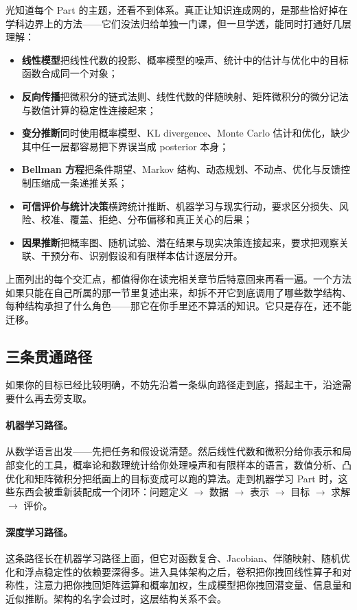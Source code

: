 光知道每个 Part 的主题，还看不到体系。真正让知识连成网的，是那些恰好掉在学科边界上的方法——它们没法归给单独一门课，但一旦学透，能同时打通好几层理解：

\begin{itemize}
\item
  \textbf{线性模型}把线性代数的投影、概率模型的噪声、统计中的估计与优化中的目标函数合成同一个对象；
\item
  \textbf{反向传播}把微积分的链式法则、线性代数的伴随映射、矩阵微积分的微分记法与数值计算的稳定性连接起来；
\item
  \textbf{变分推断}同时使用概率模型、KL divergence、Monte Carlo 估计和优化，缺少其中任一层都容易把下界误当成 posterior 本身；
\item
  \textbf{Bellman 方程}把条件期望、Markov 结构、动态规划、不动点、优化与反馈控制压缩成一条递推关系；
\item
  \textbf{可信评价与统计决策}横跨统计推断、机器学习与现实行动，要求区分损失、风险、校准、覆盖、拒绝、分布偏移和真正关心的后果；
\item
  \textbf{因果推断}把概率图、随机试验、潜在结果与现实决策连接起来，要求把观察关联、干预分布、识别假设和有限样本估计逐层分开。
\end{itemize}

上面列出的每个交汇点，都值得你在读完相关章节后特意回来再看一遍。一个方法如果只能在自己所属的那一节里复述出来，却拆不开它到底调用了哪些数学结构、每种结构承担了什么角色——那它在你手里还不算活的知识。它只是存在，还不能迁移。

\subsection{三条贯通路径}

如果你的目标已经比较明确，不妨先沿着一条纵向路径走到底，搭起主干，沿途需要什么再去旁支取。

\paragraph{机器学习路径。}
从数学语言出发——先把任务和假设说清楚。然后线性代数和微积分给你表示和局部变化的工具，概率论和数理统计给你处理噪声和有限样本的语言，数值分析、凸优化和矩阵微积分把纸面上的目标变成可以跑的算法。走到机器学习 Part 时，这些东西会被重新装配成一个闭环：问题定义 \(\to\) 数据 \(\to\) 表示 \(\to\) 目标 \(\to\) 求解 \(\to\) 评价。

\paragraph{深度学习路径。}
这条路径长在机器学习路径上面，但它对函数复合、Jacobian、伴随映射、随机优化和浮点稳定性的依赖要深得多。进入具体架构之后，卷积把你拽回线性算子和对称性，注意力把你拽回矩阵运算和概率加权，生成模型把你拽回潜变量、信息量和近似推断。架构的名字会过时，这层结构关系不会。

